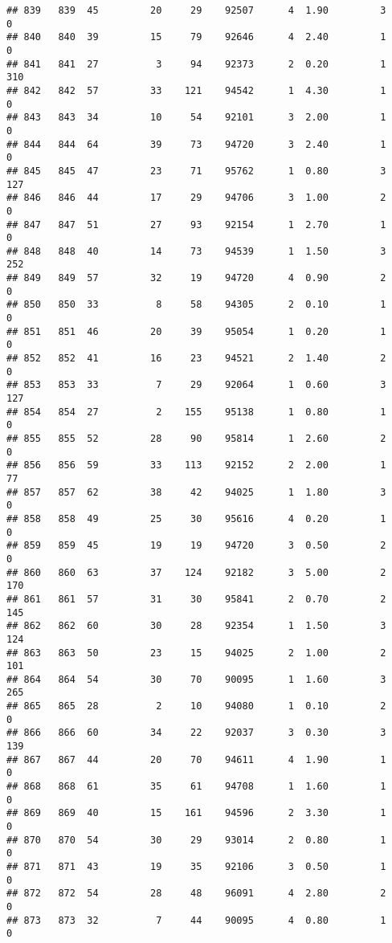 \documentclass[
]{article}
\begin{document}
\begin{verbatim}
## 839   839  45         20     29    92507      4  1.90         3        0
## 840   840  39         15     79    92646      4  2.40         1        0
## 841   841  27          3     94    92373      2  0.20         1      310
## 842   842  57         33    121    94542      1  4.30         1        0
## 843   843  34         10     54    92101      3  2.00         1        0
## 844   844  64         39     73    94720      3  2.40         1        0
## 845   845  47         23     71    95762      1  0.80         3      127
## 846   846  44         17     29    94706      3  1.00         2        0
## 847   847  51         27     93    92154      1  2.70         1        0
## 848   848  40         14     73    94539      1  1.50         3      252
## 849   849  57         32     19    94720      4  0.90         2        0
## 850   850  33          8     58    94305      2  0.10         1        0
## 851   851  46         20     39    95054      1  0.20         1        0
## 852   852  41         16     23    94521      2  1.40         2        0
## 853   853  33          7     29    92064      1  0.60         3      127
## 854   854  27          2    155    95138      1  0.80         1        0
## 855   855  52         28     90    95814      1  2.60         2        0
## 856   856  59         33    113    92152      2  2.00         1       77
## 857   857  62         38     42    94025      1  1.80         3        0
## 858   858  49         25     30    95616      4  0.20         1        0
## 859   859  45         19     19    94720      3  0.50         2        0
## 860   860  63         37    124    92182      3  5.00         2      170
## 861   861  57         31     30    95841      2  0.70         2      145
## 862   862  60         30     28    92354      1  1.50         3      124
## 863   863  50         23     15    94025      2  1.00         2      101
## 864   864  54         30     70    90095      1  1.60         3      265
## 865   865  28          2     10    94080      1  0.10         2        0
## 866   866  60         34     22    92037      3  0.30         3      139
## 867   867  44         20     70    94611      4  1.90         1        0
## 868   868  61         35     61    94708      1  1.60         1        0
## 869   869  40         15    161    94596      2  3.30         1        0
## 870   870  54         30     29    93014      2  0.80         1        0
## 871   871  43         19     35    92106      3  0.50         1        0
## 872   872  54         28     48    96091      4  2.80         2        0
## 873   873  32          7     44    90095      4  0.80         1        0

\end{verbatim}
\end{document}
